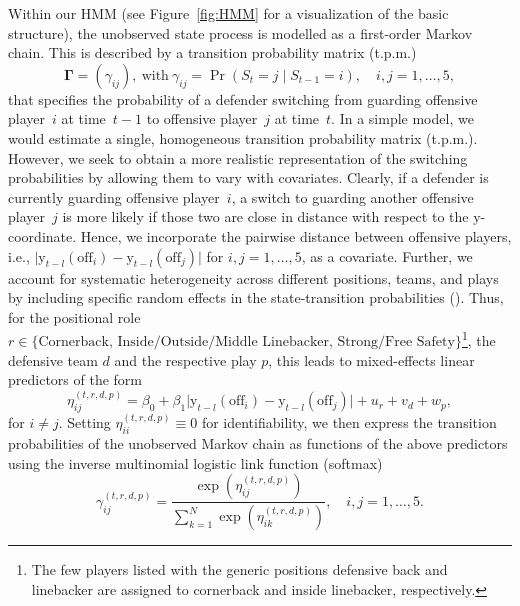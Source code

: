 \documentclass[namedate,webpdf,modern,medium]{oup-authoring-template}
\begin{document}
Within our HMM (see Figure~\ref{fig:HMM} for a visualization of the basic structure), the unobserved state process is modelled as a first-order Markov chain. This is described by 
a transition probability matrix (t.p.m.) 
$$\boldsymbol{\Gamma} = (\gamma_{ij}),\ \text{with} \  \gamma_{ij} = \Pr(S_t = j \mid S_{t-1} = i), \quad i,j = 1, \ldots, 5,$$
that specifies the probability of a defender switching from guarding offensive player~$i$ at time~$t-1$ to offensive player~$j$ at time~$t$.
In a simple model, we would estimate a single, homogeneous transition probability matrix (t.p.m.). However, we seek to obtain a more realistic representation of the switching probabilities by allowing them to vary with covariates. 
Clearly, if a defender is currently guarding offensive player~$i$, a switch to guarding another offensive player~$j$ is more likely if those two are close in distance with respect to the $\mathrm{y}$-coordinate. Hence, we incorporate the pairwise distance between offensive players, i.e., $\vert \mathrm{y}_{t-l}(\text{off}_i) - \mathrm{y}_{t-l}(\text{off}_j) \vert$ for $i,j = 1, \ldots, 5$, as a covariate.
Further, we account for systematic heterogeneity across different positions, teams, and plays by including specific random effects in the state-transition probabilities (\citealp{maruotti2009semiparametric}). Thus, for the positional role $r \in \{\text{Cornerback, Inside/Outside/Middle Linebacker, Strong/Free Safety}\}$\footnote{The few players listed with the generic positions defensive back and linebacker are assigned to cornerback and inside linebacker, respectively.}, the defensive team $d$ and the respective play $p$, this leads to mixed-effects linear predictors of the form
\begin{equation}\label{eq:re}    
\eta_{ij}^{(t,r,d,p)} = \beta_0 + \beta_1 \vert \mathrm{y}_{t-l}(\text{off}_i) -  \mathrm{y}_{t-l}(\text{off}_j) \vert + u_{r} + v_{d} + w_p,
\end{equation}
for $i \neq j$. Setting $\eta_{ii}^{(t,r,d,p)} \equiv 0$ for identifiability, we then express the transition probabilities of the unobserved Markov chain as functions of the above predictors using the inverse multinomial logistic link function (softmax)
$$
\gamma_{ij}^{(t,r,d,p)} = \frac{\exp(\eta_{ij}^{(t,r,d,p)})}{\sum_{k=1}^N \exp(\eta_{ik}^{(t,r,d,p)})}, \quad i, j = 1, \dotsc, 5.
$$
\end{document}
